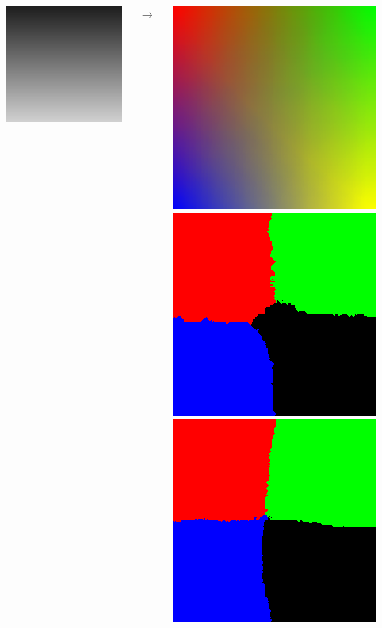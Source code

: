 \documentclass{beamer}
\begin{document}
\begin{frame}
\begin{columns}[c]
        \includegraphics[scale=0.15]{Interpolated5DimImage5.png}

        $\rightarrow$

        \includegraphics[scale=0.2]{rf.png} \hspace{0.3pt}
        \includegraphics[scale=0.2]{rf256.png} \\
        \includegraphics[scale=0.2]{rf1000.png} \hspace{0.3pt}

\end{columns}
\end{frame}
\end{document}

